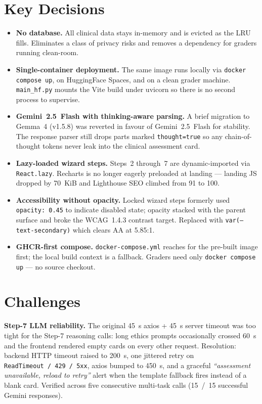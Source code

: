 \documentclass[10pt,a4paper,twocolumn]{article}
\begin{document}
\section{Key Decisions}
\begin{itemize}[leftmargin=*,itemsep=0.25ex,topsep=0pt]
  \item \textbf{No database.} All clinical data stays in-memory and is evicted as the LRU fills. Eliminates a class of privacy risks and removes a dependency for graders running clean-room.
  \item \textbf{Single-container deployment.} The same image runs locally via \texttt{docker compose up}, on HuggingFace Spaces, and on a clean grader machine. \texttt{main\_hf.py} mounts the Vite build under uvicorn so there is no second process to supervise.
  \item \textbf{Gemini~2.5~Flash with thinking-aware parsing.} A brief migration to Gemma~4 (v1.5.8) was reverted in favour of Gemini~2.5~Flash for stability. The response parser still drops parts marked \texttt{thought=true} so any chain-of-thought tokens never leak into the clinical assessment card.
  \item \textbf{Lazy-loaded wizard steps.} Steps~2 through~7 are dynamic-imported via \texttt{React.lazy}. Recharts is no longer eagerly preloaded at landing --- landing JS dropped by 70~KiB and Lighthouse SEO climbed from 91 to 100.
  \item \textbf{Accessibility without opacity.} Locked wizard steps formerly used \texttt{opacity: 0.45} to indicate disabled state; opacity stacked with the parent surface and broke the WCAG~1.4.3 contrast target. Replaced with \texttt{var(--text-secondary)} which clears AA at 5.85:1.
  \item \textbf{GHCR-first compose.} \texttt{docker-compose.yml} reaches for the pre-built image first; the local build context is a fallback. Graders need only \texttt{docker compose up} --- no source checkout.
\end{itemize}

\section{Challenges}
\textbf{Step-7 LLM reliability.} The original 45~s axios + 45~s server timeout was too tight for the Step-7 reasoning calls: long ethics prompts occasionally crossed 60~s and the frontend rendered empty cards on every other request. Resolution: backend HTTP timeout raised to 200~s, one jittered retry on \texttt{ReadTimeout~/~429~/~5xx}, axios bumped to 450~s, and a graceful \emph{``assessment unavailable, reload to retry''} alert when the template fallback fires instead of a blank card. Verified across five consecutive multi-task calls (15~/~15 successful Gemini responses).
\end{document}
